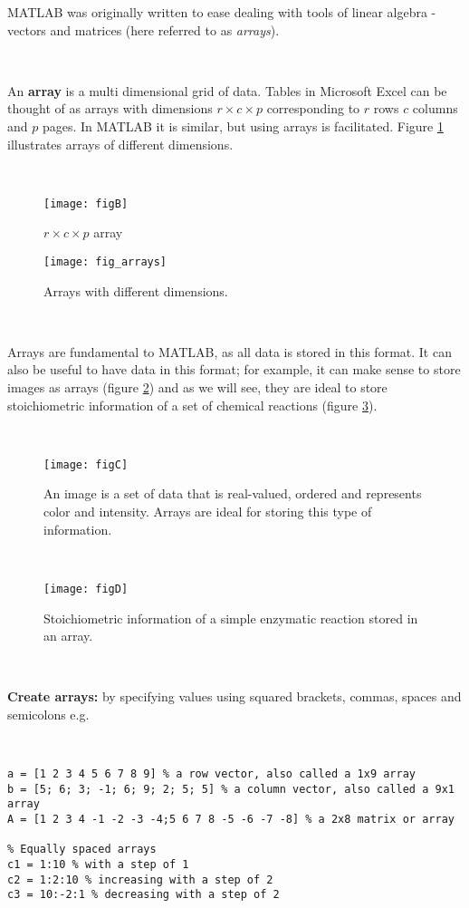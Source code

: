 \documentclass[11pt]{amsart}
\begin{document}
MATLAB was originally written to ease dealing with tools of linear algebra - vectors and matrices (here referred to as {\it arrays}).

\

An {\bf array} is a multi dimensional grid of data. Tables in Microsoft Excel can be thought of as arrays with dimensions $r \times c \times p$ corresponding to $r$ rows $c$ columns and $p$ pages. In MATLAB it is similar, but using arrays is facilitated. Figure \ref{figB} illustrates arrays of different dimensions. 

\

\begin{figure}[h]
\centering
\caption{Arrays with different dimensions.}
\label{figB}
	 \texttt{[image: figB]}
	 
	 $r \times c \times p$ array
	 
 	 \texttt{[image: fig\_arrays]}
\end{figure}

\

Arrays are fundamental to MATLAB, as all data is stored in this format. It can also be useful to have data in this format; for example, it can make sense to store images as arrays (figure \ref{figC}) and as we will see, they are ideal to store stoichiometric information of a set of chemical reactions (figure \ref{figD}).

\

\begin{figure}[h]
\centering
\caption{An image is a set of data that is real-valued, ordered and represents color and intensity. Arrays are ideal for storing this type of information.}
\label{figC}
	 \texttt{[image: figC]}
\end{figure}

\

\begin{figure}[h]
\centering
\caption{Stoichiometric information of a simple enzymatic reaction stored in an array.}
\label{figD}
	 \texttt{[image: figD]}
\end{figure}

\

{\bf Create arrays:} by specifying values using squared brackets, commas, spaces and semicolons
e.g.

\

\color{blue}
\begin{verbatim}
a = [1 2 3 4 5 6 7 8 9] % a row vector, also called a 1x9 array
b = [5; 6; 3; -1; 6; 9; 2; 5; 5] % a column vector, also called a 9x1 array
A = [1 2 3 4 -1 -2 -3 -4;5 6 7 8 -5 -6 -7 -8] % a 2x8 matrix or array 

% Equally spaced arrays
c1 = 1:10 % with a step of 1
c2 = 1:2:10 % increasing with a step of 2
c3 = 10:-2:1 % decreasing with a step of 2
\end{verbatim}
\color{black}
\end{document}

